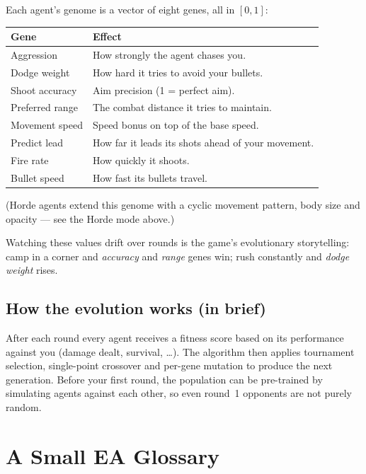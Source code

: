 \documentclass[11pt,a4paper]{report}
\begin{document}
Each agent's genome is a vector of eight genes, all in $[0,1]$:

\begin{center}
\begin{tabularx}{\textwidth}{l X}
  \toprule
  \textbf{Gene} & \textbf{Effect} \\
  \midrule
  Aggression       & How strongly the agent chases you. \\
  Dodge weight     & How hard it tries to avoid your bullets. \\
  Shoot accuracy   & Aim precision (1 = perfect aim). \\
  Preferred range  & The combat distance it tries to maintain. \\
  Movement speed   & Speed bonus on top of the base speed. \\
  Predict lead     & How far it leads its shots ahead of your movement. \\
  Fire rate        & How quickly it shoots. \\
  Bullet speed     & How fast its bullets travel. \\
  \bottomrule
\end{tabularx}
\end{center}

(Horde agents extend this genome with a cyclic movement pattern, body size
and opacity --- see the Horde mode above.)

Watching these values drift over rounds is the game's evolutionary
storytelling: camp in a corner and \emph{accuracy} and \emph{range} genes
win; rush constantly and \emph{dodge weight} rises.

\section{How the evolution works (in brief)}

After each round every agent receives a fitness score based on its
performance against you (damage dealt, survival, \ldots). The algorithm
then applies tournament selection, single-point crossover and per-gene
mutation to produce the next generation. Before your first round, the
population can be pre-trained by simulating agents against each other, so
even round~1 opponents are not purely random.

\chapter{A Small EA Glossary}
\label{ch:glossary}
\end{document}
